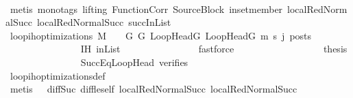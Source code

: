 \begin{isabellebody}
\ \ \ \ \ \ \ \ \ \ \ \ \ \ \isamarkupfalse%
\ {\isacharparenleft}{\kern0pt}metis\ {\isacharparenleft}{\kern0pt}mono{\isacharunderscore}{\kern0pt}tags{\isacharcomma}{\kern0pt}\ lifting{\isacharparenright}{\kern0pt}\ FunctionCorr\ SourceBlock\ in{\isacharunderscore}{\kern0pt}set{\isacharunderscore}{\kern0pt}member\ local{\isachardot}{\kern0pt}RedNormalSucc{\isacharparenleft}{\kern0pt}{}{\isacharparenright}{\kern0pt}\ local{\isachardot}{\kern0pt}RedNormalSucc{\isacharparenleft}{\kern0pt}{}{\isacharparenright}{\kern0pt}\ succInList{\isacharparenright}{\kern0pt}\isanewline
\ \ \isanewline
\ \ \ \ \ \ \ \ \ \ \ \ \isamarkupfalse%
\ {\isachardoublequoteopen}loop{\isacharunderscore}{\kern0pt}ih{\isacharunderscore}{\kern0pt}optimizations\ M\ {\isasymLambda}\ {\isasymGamma}\ {\isasymOmega}\ G\ G{\isacharprime}{\kern0pt}\ LoopHeadG\ LoopHeadG{\isacharprime}{\kern0pt}\ m{\isacharprime}{\kern0pt}\ s{\isacharprime}{\kern0pt}\ j\ posts{\isachardoublequoteclose}\isanewline
\ \ \ \ \ \ \ \ \ \ \ \ \ \ \isamarkupfalse%
\ IH\ inList\isanewline
\ \ \ \ \ \ \ \ \ \ \ \ \ \ \isamarkupfalse%
\ fastforce\isanewline
\ \ \isanewline
\ \ \ \ \ \ \ \ \ \ \ \ \isamarkupfalse%
\ \isamarkupfalse%
\ {\isacharquery}{\kern0pt}thesis\isanewline
\ \ \ \ \ \ \ \ \ \ \ \ \ \ \isamarkupfalse%
\ SuccEqLoopHead\ verifies\isanewline
\ \ \ \ \ \ \ \ \ \ \ \ \ \ \isamarkupfalse%
\ loop{\isacharunderscore}{\kern0pt}ih{\isacharunderscore}{\kern0pt}optimizations{\isacharunderscore}{\kern0pt}def\isanewline
\ \ \ \ \ \ \ \ \ \ \ \ \ \ \isamarkupfalse%
\ {\isacharparenleft}{\kern0pt}metis\ {\isachardoublequoteopen}{}{\isachardoublequoteclose}{\isacharparenleft}{\kern0pt}{}{\isacharparenright}{\kern0pt}\ {\isachardoublequoteopen}{}{\isachardoublequoteclose}{\isacharparenleft}{\kern0pt}{}{\isacharparenright}{\kern0pt}\ diff{\isacharunderscore}{\kern0pt}Suc{\isacharunderscore}{\kern0pt}{}\ diff{\isacharunderscore}{\kern0pt}le{\isacharunderscore}{\kern0pt}self\ local{\isachardot}{\kern0pt}RedNormalSucc{\isacharparenleft}{\kern0pt}{}{\isacharparenright}{\kern0pt}\ local{\isachardot}{\kern0pt}RedNormalSucc{\isacharparenleft}{\kern0pt}{}{\isacharparenright}{\kern0pt}{\isacharparenright}{\kern0pt}\isanewline
\ \ \ \ \ \ \ \ \ \ \isamarkupfalse%
\isanewline
\ \ \ \ \ \ \ \ \isamarkupfalse%

\end{isabellebody}
